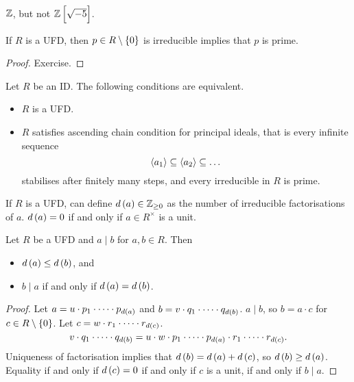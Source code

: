 \begin{example*}
$ \mathbb{Z} $, but not $ \Z\sbr{\sqrt{-5}} $.
\end{example*}

\begin{lemma}
If $ R $ is a UFD, then $ p \in R \setminus \cbr{0} $ is irreducible implies that $ p $ is prime.
\end{lemma}

\begin{proof}
Exercise.
\end{proof}

\begin{theorem}
\label{thm:ufd}
Let $ R $ be an ID. The following conditions are equivalent.
\begin{itemize}
\item $ R $ is a UFD.
\item $ R $ satisfies ascending chain condition for principal ideals, that is every infinite sequence
$$ \left\langle a_1 \right\rangle \subseteq \left\langle a_2 \right\rangle \subseteq \dots $$
stabilises after finitely many steps, and every irreducible in $ R $ is prime.
\end{itemize}
\end{theorem}

If $ R $ is a UFD, can define $ d\br{a} \in \Z_{\ge 0} $ as the number of irreducible factorisations of $ a $. $ d\br{a} = 0 $ if and only if $ a \in R^\times $ is a unit.

\begin{lemma}
Let $ R $ be a UFD and $ a \mid b $ for $ a, b \in R $. Then
\begin{itemize}
\item $ d\br{a} \le d\br{b} $, and
\item $ b \mid a $ if and only if $ d\br{a} = d\br{b} $.
\end{itemize}
\end{lemma}


\begin{proof}
Let $ a = u \cdot p_1 \cdot \dots \cdot p_{d\br{a}} $ and $ b = v \cdot q_1 \cdot \dots \cdot q_{d\br{b}} $. $ a \mid b $, so $ b = a \cdot c $ for $ c \in R \setminus \cbr{0} $. Let $ c = w \cdot r_1 \cdot \dots \cdot r_{d\br{c}} $.
$$ v \cdot q_1 \cdot \dots \cdot q_{d\br{b}} = u \cdot w \cdot p_1 \cdot \dots \cdot p_{d\br{a}} \cdot r_1 \cdot \dots \cdot r_{d\br{c}}. $$
Uniqueness of factorisation implies that $ d\br{b} = d\br{a} + d\br{c} $, so $ d\br{b} \ge d\br{a} $. Equality if and only if $ d\br{c} = 0 $ if and only if $ c $ is a unit, if and only if $ b \mid a $.
\end{proof}

